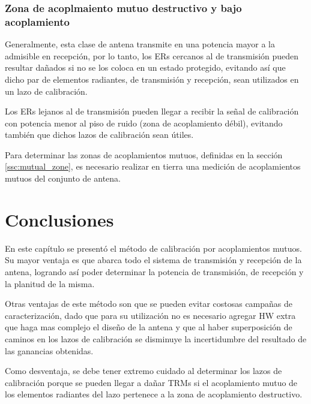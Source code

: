 \subsubsection{Zona de acoplmaiento mutuo destructivo y bajo acoplamiento}

Generalmente, esta clase de antena transmite en una potencia mayor a la admisible en recepción, por lo tanto, los ERs cercanos al
de transmisión pueden resultar dañados si no se los coloca en un estado protegido, evitando así que dicho par de elementos
radiantes, de transmisión y recepción, sean utilizados en un lazo de calibración.

Los ERs lejanos al de transmisión pueden llegar a recibir la señal de calibración con potencia menor al piso de ruido (zona de
acoplamiento débil), evitando también que dichos lazos de calibración sean útiles.

Para determinar las zonas de acoplamientos mutuos, definidas en la sección \ref{ssc:mutual_zone}, es necesario realizar en tierra
una medición de acoplamientos mutuos del conjunto de antena.

\section{Conclusiones}

En este capítulo se presentó el método de calibración por acoplamientos mutuos. Su mayor ventaja es que abarca todo el sistema de
transmisión y recepción de la antena, logrando así poder determinar la potencia de transmisión, de recepción y la planitud de la
misma.

Otras ventajas de este método son que se pueden evitar costosas campañas de caracterización, dado que para su utilización no es
necesario agregar HW extra que haga mas complejo el diseño de la antena y que al haber superposición de caminos en los lazos de
calibración se disminuye la incertidumbre del resultado de las ganancias obtenidas.

Como desventaja, se debe tener extremo cuidado al determinar los lazos de calibración porque se pueden llegar a dañar TRMs si el
acoplamiento mutuo de los elementos radiantes del lazo pertenece a la zona de acoplamiento destructivo.


